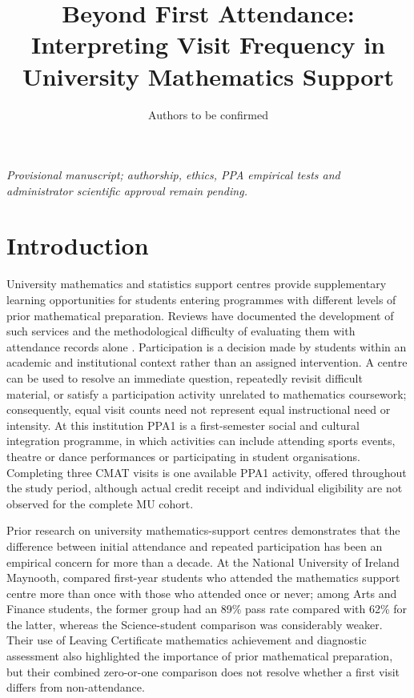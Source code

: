 \documentclass[namedate,webpdf,imaiai]{ima-authoring-template}
\title[Beyond first attendance]{Beyond First Attendance: Interpreting Visit Frequency in University Mathematics Support}
\author{Authors to be confirmed\address{Affiliations pending institutional review}}
\begin{document}
\maketitle
\begin{center}\small\emph{Provisional manuscript; authorship, ethics, PPA empirical tests and administrator scientific approval remain pending.}\end{center}

\section{Introduction}

University mathematics and statistics support centres provide supplementary learning opportunities for students entering programmes with different levels of prior mathematical preparation. Reviews have documented the development of such services and the methodological difficulty of evaluating them with attendance records alone \citep{matthews2013,lawson2020,mullen2024}. Participation is a decision made by students within an academic and institutional context rather than an assigned intervention. A centre can be used to resolve an immediate question, repeatedly revisit difficult material, or satisfy a participation activity unrelated to mathematics coursework; consequently, equal visit counts need not represent equal instructional need or intensity. At this institution PPA1 is a first-semester social and cultural integration programme, in which activities can include attending sports events, theatre or dance performances or participating in student organisations. Completing three CMAT visits is one available PPA1 activity, offered throughout the study period, although actual credit receipt and individual eligibility are not observed for the complete MU cohort.

Prior research on university mathematics-support centres demonstrates that the difference between initial attendance and repeated participation has been an empirical concern for more than a decade. At the National University of Ireland Maynooth, \citet{macanbhaird2009} compared first-year students who attended the mathematics support centre more than once with those who attended once or never; among Arts and Finance students, the former group had an 89\% pass rate compared with 62\% for the latter, whereas the Science-student comparison was considerably weaker. Their use of Leaving Certificate mathematics achievement and diagnostic assessment also highlighted the importance of prior mathematical preparation, but their combined zero-or-one comparison does not resolve whether a first visit differs from non-attendance.
\end{document}
